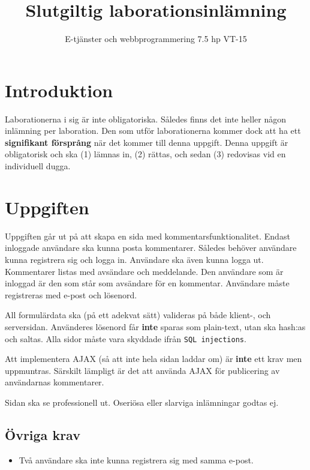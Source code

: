 \documentclass[12pt]{article}
\date{}
\title{ Slutgiltig laborationsinlämning }
\author{ E-tjänster och webbprogrammering 7.5 hp VT-15 }
\begin{document}
\maketitle
\vspace{-2em}



\section{Introduktion}
Laborationerna i sig är inte obligatoriska. Således finns det inte heller någon inlämning per laboration. Den som utför laborationerna kommer dock att ha ett \textbf{signifikant försprång} när det kommer till denna uppgift. Denna uppgift är obligatorisk och ska (1) lämnas in, (2) rättas, och sedan (3) redovisas vid en individuell dugga.

\section{Uppgiften}
Uppgiften går ut på att skapa en sida med kommentarsfunktionalitet. Endast inloggade användare ska kunna posta kommentarer. Således behöver användare kunna registrera sig och logga in. Användare ska även kunna logga ut. Kommentarer listas med avsändare och meddelande. Den användare som är inloggad är den som står som avsändare för en kommentar. Användare måste registreras med e-post och lösenord.

All formulärdata ska (på ett adekvat sätt) valideras på både klient-, och serversidan. Använderes lösenord får \textbf{inte} sparas som plain-text, utan ska hash:as och saltas. Alla sidor måste vara skyddade ifrån \texttt{SQL injections}.

Att implementera AJAX (så att inte hela sidan laddar om) är \textbf{inte} ett krav men uppmuntras. Särskilt lämpligt är det att använda AJAX för publicering av användarnas kommentarer. 

Sidan ska se professionell ut. Oseriösa eller slarviga inlämningar godtas ej.

\subsection{Övriga krav}
\begin{itemize}
  \item Två användare ska inte kunna registrera sig med samma e-post.
\end{itemize}
\end{document}

